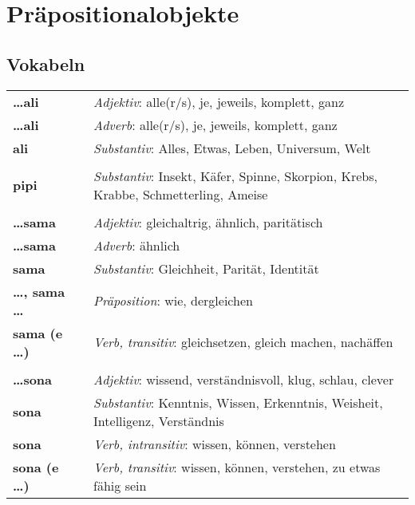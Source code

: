 \section{Präpositionalobjekte}
%
\subsection*{Vokabeln}
%
\begin{supertabular}{p{2,5cm}|ll}
%
\textbf{\dots ali} && \textit{Adjektiv}: alle(r/s), je, jeweils, komplett, ganz \\ %
\textbf{\dots ali} && \textit{Adverb}: alle(r/s), je, jeweils, komplett, ganz \\ %
\textbf{ali} && \textit{Substantiv}: Alles, Etwas, Leben, Universum, Welt \\ %
 && \\ %
%
\textbf{pipi} && \textit{Substantiv}: Insekt, Käfer, Spinne, Skorpion, Krebs, Krabbe, Schmetterling, Ameise \\  %
 && \\ %
%
\textbf{\dots sama} && \textit{Adjektiv}: gleichaltrig, ähnlich, paritätisch \\ %
\textbf{\dots sama} && \textit{Adverb}: ähnlich \\ %
\textbf{sama} && \textit{Substantiv}: Gleichheit, Parität, Identität \\ %
\textbf{\dots , sama \dots} && \textit{Präposition}: wie, dergleichen \\ %
\textbf{sama (e \dots)} && \textit{Verb, transitiv}: gleichsetzen, gleich machen, nachäffen \\ %
 && \\ %
%
\textbf{\dots sona} && \textit{Adjektiv}: wissend, verständnisvoll, klug, schlau, clever \\ %
\textbf{sona} && \textit{Substantiv}: Kenntnis, Wissen, Erkenntnis, Weisheit, Intelligenz, Verständnis \\ %
\textbf{sona} && \textit{Verb, intransitiv}: wissen, können, verstehen \\ %
\textbf{sona (e \dots)} && \textit{Verb, transitiv}: wissen, können, verstehen, zu etwas fähig sein \\ %

\end{supertabular}
